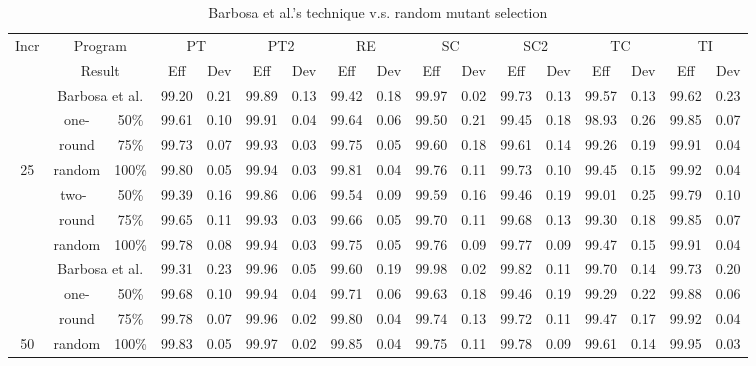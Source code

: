 


\begin{table*}[t]
\caption{\label{tab:Ran-Barbosa} Barbosa et al.'s technique v.s.
random mutant selection} \centering \hspace*{-0.8cm}
\begin{tabular}{|c||c|c||c|c||c|c||c|c||c|c||c|c||c|c||c|c|}
  \hline
  Incr&\multicolumn{2}{|c||}{Program}
  &\multicolumn{2}{|c||}{PT}&\multicolumn{2}{|c||}{PT2}&\multicolumn{2}{|c||}{RE}&\multicolumn{2}{|c||}{SC}&\multicolumn{2}{|c||}{SC2}&\multicolumn{2}{|c||}{TC}&\multicolumn{2}{|c|}{TI}\\
  \cline{2-17}
  ~&\multicolumn{2}{|c||}{Result}
  &Eff&Dev&Eff&Dev&Eff&Dev&Eff&Dev&Eff&Dev&Eff&Dev&Eff&Dev\\
  \hline
  \hline
  ~&\multicolumn{2}{|c||}{Barbosa et al.}&99.20&0.21&99.89&0.13&99.42&0.18&99.97&0.02&99.73&0.13&99.57&0.13&99.62&0.23\\
  \cline{2-17}
  ~&one-&50\%&99.61&0.10&99.91&0.04&99.64&0.06&99.50&0.21&99.45&0.18&98.93&0.26&99.85&0.07\\
  \cline{3-17}
  ~&round&75\%&99.73&0.07&99.93&0.03&99.75&0.05&99.60&0.18&99.61&0.14&99.26&0.19&99.91&0.04\\
  \cline{3-17}
  25&random&100\%&99.80&0.05&99.94&0.03&99.81&0.04&99.76&0.11&99.73&0.10&99.45&0.15&99.92&0.04\\
  \cline{2-17}
  ~&two-~&50\%&99.39&0.16&99.86&0.06&99.54&0.09&99.59&0.16&99.46&0.19&99.01&0.25&99.79&0.10\\
  \cline{3-17}
  ~&round&75\%&99.65&0.11&99.93&0.03&99.66&0.05&99.70&0.11&99.68&0.13&99.30&0.18&99.85&0.07\\
  \cline{3-17}
  ~&random&100\%&99.78&0.08&99.94&0.03&99.75&0.05&99.76&0.09&99.77&0.09&99.47&0.15&99.91&0.04\\
  \hline
  \hline
  ~&\multicolumn{2}{|c||}{Barbosa et al.}&99.31&0.23&99.96&0.05&99.60&0.19&99.98&0.02&99.82&0.11&99.70&0.14&99.73&0.20\\
  \cline{2-17}
  ~&one-&50\%&99.68&0.10&99.94&0.04&99.71&0.06&99.63&0.18&99.46&0.19&99.29&0.22&99.88&0.06\\
  \cline{3-17}
  ~&round&75\%&99.78&0.07&99.96&0.02&99.80&0.04&99.74&0.13&99.72&0.11&99.47&0.17&99.92&0.04\\
  \cline{3-17}
  50&random&100\%&99.83&0.05&99.97&0.02&99.85&0.04&99.75&0.11&99.78&0.09&99.61&0.14&99.95&0.03\\
  \cline{2-17}

\end{tabular}
\end{table*}
